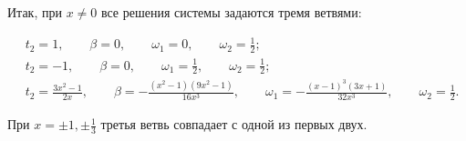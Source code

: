\documentclass[12pt,a4paper]{article}
\begin{document}
	Итак, при \(x\neq0\) все решения системы задаются тремя ветвями:
	
	$$
	\boxed{
		\begin{aligned}
			&t_2=1,\qquad
			\beta=0,\qquad
			\omega_1=0,\qquad
			\omega_2=\frac12;
			\\[2mm]
			&t_2=-1,\qquad
			\beta=0,\qquad
			\omega_1=\frac12,\qquad
			\omega_2=\frac12;
			\\[2mm]
			&t_2=\frac{3x^2-1}{2x},\qquad
			\beta=-\frac{(x^2-1)(9x^2-1)}{16x^3},\qquad
			\omega_1=-\frac{(x-1)^3(3x+1)}{32x^3},\qquad
			\omega_2=\frac12.
		\end{aligned}
	}
	$$
	
	При \(x=\pm1,\pm\frac13\) третья ветвь совпадает с одной из первых двух.
	
	
	
\end{document}
